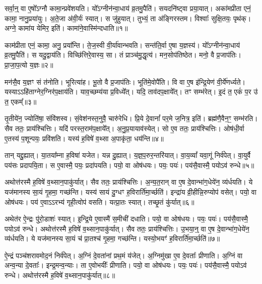 \setcounter{anuvakam}{0}

सर्वा॒न्॒ वा ए॒षो᳚\-ऽग्नौ कामा॒न्प्रवे॑शयति।
यो᳚ऽग्नीन॑न्वा॒धाय॑ व्र॒तमु॒पैति॑।
सयदनि॑ष्ट्वा प्रया॒यात्।
अका॑मप्रीता एनं॒ कामा॒ नानु॒प्रया॑युः।
अ॒ते॒जा अ॑वी॒र्यः॑ स्यात्।
स जु॑हुयात्।
तुभ्यं॒ ता अ॑ङ्गिरस्तम।
विश्वाः᳚ सुक्षि॒तयः॒ पृथ॑क्।
अग्ने॒ कामा॑य येमिर॒ इति॑।
कामा॑ने॒वास्मि॑न्दधाति॥१॥\ip

काम॑प्रीता एनं॒ कामा॒ अनु॒ प्रया᳚न्ति।
ते॒ज॒स्वी वी॒र्या॑वान्भवति।
सन्त॑ति॒र्वा ए॒षा य॒ज्ञस्य॑।
यो᳚ऽग्नीन॑न्वा॒धाय॑ व्र॒तमु॒पैति॑।
स यदु॒द्वाय॑ति।
विच्छि॑त्तिरे॒वास्य॒ सा।
तं प्राञ्च॑मु॒द्धृत्य॑।
मन॒सोप॑तिष्ठेत।
मनो॒ वै प्र॒जा\-प॑तिः।
प्रा॒जा॒प॒त्यो य॒ज्ञः॥२॥\ip

मन॑सै॒व य॒ज्ञꣳ सं त॑नोति।
भूरित्या॑ह।
भू॒तो वै प्र॒जा\-प॑तिः।
भूति॑मे॒वोपै॑ति।
वि वा ए॒ष इ॑न्द्रि॒येण॑ वी॒र्ये॑णर्ध्यते।
यस्याऽऽहि॑ताग्नेर॒ग्निर॑प॒क्षाय॑ति।
याव॒च्छम्य॑या प्र॒विध्ये᳚त्।
यदि॒ ताव॑दप॒क्षाये᳚त्।
तꣳ सम्भ॑रेत्।
इ॒दं त॒ एकं॑ प॒र उ॑ त॒ एकम्᳚॥३॥\ip

तृ॒तीये॑न॒ ज्योति॑षा॒ संवि॑शस्व।
सं॒वेश॑नस्त॒नुवै॒ चारु॑रेधि।
प्रि॒ये दे॒वानां᳚ पर॒मे ज॒नित्र॒ इति॑।
ब्रह्म॑णै॒वैन॒ꣳ॒ सम्भ॑रति।
सैव ततः॒ प्राय॑श्चित्तिः।
यदि॑ परस्त॒राम॑प॒क्षाये᳚त्।
अ॒नु॒प्र॒यायाव॑स्येत्।
सो ए॒व ततः॒ प्राय॑श्चित्तिः।
ओष॑धी॒र्वा ए॒तस्य॑ प॒शून्पयः॒ प्रवि॑शति।
यस्य॑ ह॒विषे॑ व॒थ्सा अ॒पाकृ॑ता॒ धय॑न्ति॥४॥\ip

तान् यद्दु॒ह्यात्।
या॒तया᳚म्ना ह॒विषा॑ यजेत।
यन्न दु॒ह्यात्।
य॒ज्ञ॒प॒रुर॒न्तरि॑यात्।
वा॒य॒व्यां᳚ यवा॒गूं निर्व॑पेत्।
वा॒युर्वै पय॑सः प्रदापयि॒ता।
स ए॒वास्मै॒ पयः॒ प्रदा॑पयति।
पयो॒ वा ओष॑धयः।
पयः॒ पयः॑।
पय॑सै॒वास्मै॒ पयो\-ऽव॑ रुन्धे॥५॥\ip

अथोत्त॑रस्मै ह॒विषे॑ व॒थ्सान॒पाकु॑र्यात्।
सैव ततः॒ प्राय॑श्चित्तिः।
अ॒न्य॒त॒रान् वा ए॒ष दे॒वान्भा॑ग॒धेये॑न॒ व्य॑र्धयति।
ये यज॑मानस्य सा॒यं गृ॒हमा॒ गच्छ॑न्ति।
यस्य॑ सायं दु॒ग्धꣳ ह॒विरार्ति॑मा॒र्च्छति॑।
इन्द्रा॑य व्री॒हीन्नि॒रुप्योप॑ वसेत्।
पयो॒ वा ओष॑धयः।
पय॑ ए॒वाऽऽरभ्य॑ गृही॒त्वोप॑ वसति।
यत्प्रा॒तः स्यात्।
तच्छृ॒तं कु॑र्यात्॥६॥\ip

अथेत॑र ऐ॒न्द्रः पु॑रो॒डाशः॑ स्यात्।
इ॒न्द्रि॒ये ए॒वास्मै॑ स॒मीची॑ दधाति।
पयो॒ वा ओष॑धयः।
पयः॒ पयः॑।
पय॑सै॒वास्मै॒ पयो\-ऽव॑ रुन्धे।
अथोत्त॑रस्मै ह॒विषे॑ व॒थ्सान॒पाकु॑र्यात्।
सैव ततः॒ प्राय॑श्चित्तिः।
उ॒भया॒न्॒ वा ए॒ष दे॒वान्भा॑ग॒धेये॑न॒ व्य॑र्धयति।
ये यज॑मानस्य सा॒यं च॑ प्रा॒तश्च॑ गृ॒हमा॒ गच्छ॑न्ति।
यस्यो॒भयꣳ॑ ह॒विरार्ति॑मा॒र्च्छति॑॥७॥\ip

ऐ॒न्द्रं पञ्च॑शरावमोद॒नं निर्व॑पेत्।
अ॒ग्निं दे॒वता॑नां प्रथ॒मं य॑जेत्।
अ॒ग्निमु॑खा ए॒व दे॒वताः᳚ प्रीणाति।
अ॒ग्निं वा अन्व॒न्या दे॒वताः᳚।
इन्द्र॒मन्व॒न्याः।
ता ए॒वोभयीः᳚ प्रीणाति।
पयो॒ वा ओष॑धयः।
पयः॒ पयः॑।
पय॑सै॒वास्मै॒ पयो\-ऽव॑ रुन्धे।
अथोत्त॑रस्मै ह॒विषे॑ व॒थ्सान॒पाकु॑र्यात्॥८॥\ip


